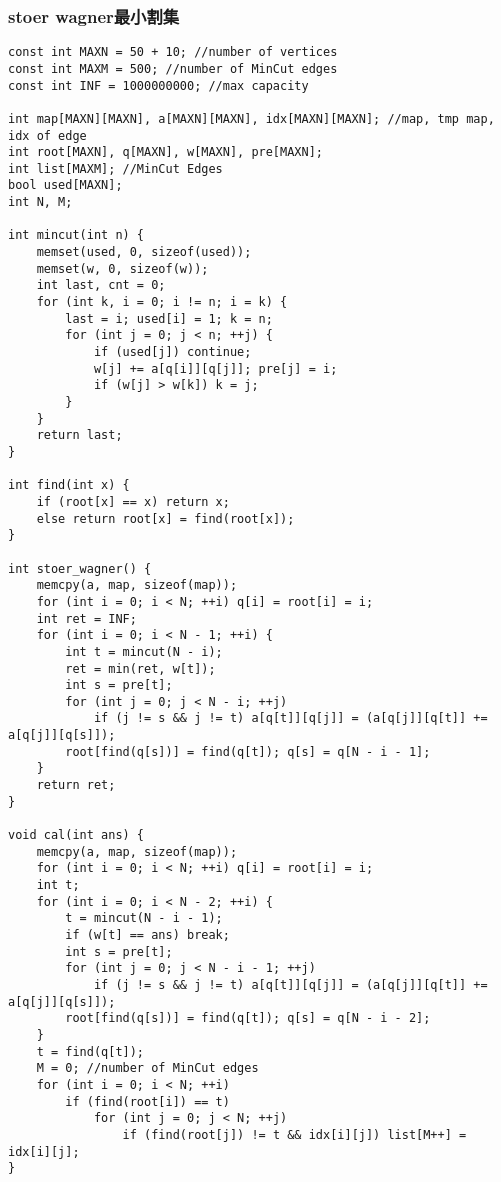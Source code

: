 \subsubsection{stoer wagner最小割集}
\begin{verbatim}
const int MAXN = 50 + 10; //number of vertices
const int MAXM = 500; //number of MinCut edges
const int INF = 1000000000; //max capacity

int map[MAXN][MAXN], a[MAXN][MAXN], idx[MAXN][MAXN]; //map, tmp map, idx of edge
int root[MAXN], q[MAXN], w[MAXN], pre[MAXN];
int list[MAXM]; //MinCut Edges
bool used[MAXN];
int N, M;

int mincut(int n) {
    memset(used, 0, sizeof(used));
    memset(w, 0, sizeof(w));
    int last, cnt = 0;
    for (int k, i = 0; i != n; i = k) {
        last = i; used[i] = 1; k = n;
        for (int j = 0; j < n; ++j) {
            if (used[j]) continue;
            w[j] += a[q[i]][q[j]]; pre[j] = i;
            if (w[j] > w[k]) k = j;
        }
    }
    return last;
}

int find(int x) {
    if (root[x] == x) return x;
    else return root[x] = find(root[x]);
}

int stoer_wagner() {
    memcpy(a, map, sizeof(map));
    for (int i = 0; i < N; ++i) q[i] = root[i] = i;
    int ret = INF;
    for (int i = 0; i < N - 1; ++i) {
        int t = mincut(N - i);
        ret = min(ret, w[t]);
        int s = pre[t];
        for (int j = 0; j < N - i; ++j)
            if (j != s && j != t) a[q[t]][q[j]] = (a[q[j]][q[t]] += a[q[j]][q[s]]);
        root[find(q[s])] = find(q[t]); q[s] = q[N - i - 1]; 
    }
    return ret;
}

void cal(int ans) {
    memcpy(a, map, sizeof(map));
    for (int i = 0; i < N; ++i) q[i] = root[i] = i;
    int t;
    for (int i = 0; i < N - 2; ++i) {
        t = mincut(N - i - 1);
        if (w[t] == ans) break;
        int s = pre[t];
        for (int j = 0; j < N - i - 1; ++j)
            if (j != s && j != t) a[q[t]][q[j]] = (a[q[j]][q[t]] += a[q[j]][q[s]]);
        root[find(q[s])] = find(q[t]); q[s] = q[N - i - 2]; 
    }
    t = find(q[t]);
    M = 0; //number of MinCut edges
    for (int i = 0; i < N; ++i)
        if (find(root[i]) == t)
            for (int j = 0; j < N; ++j)
                if (find(root[j]) != t && idx[i][j]) list[M++] = idx[i][j];
}
\end{verbatim}
